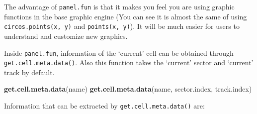 \documentclass[]{book}
\newenvironment{Shaded}{\begin{snugshade}}{\end{snugshade}}
\newcommand{\KeywordTok}[1]{\textcolor[rgb]{0.13,0.29,0.53}{\textbf{#1}}}
\newcommand{\NormalTok}[1]{#1}
\begin{document}
The advantage of \texttt{panel.fun} is that it makes you feel you are
using graphic functions in the base graphic engine (You can see it is
almost the same of using \texttt{circos.points(x,\ y)} and
\texttt{points(x,\ y)}). It will be much easier for users to understand
and customize new graphics.

Inside \texttt{panel.fun}, information of the `current' cell can be
obtained through \texttt{get.cell.meta.data()}. Also this function takes
the `current' sector and `current' track by default.

\begin{Shaded}
\begin{Highlighting}[]
\KeywordTok{get.cell.meta.data}\NormalTok{(name)}
\KeywordTok{get.cell.meta.data}\NormalTok{(name, sector.index, track.index)}
\end{Highlighting}
\end{Shaded}

Information that can be extracted by \texttt{get.cell.meta.data()} are:
\end{document}
